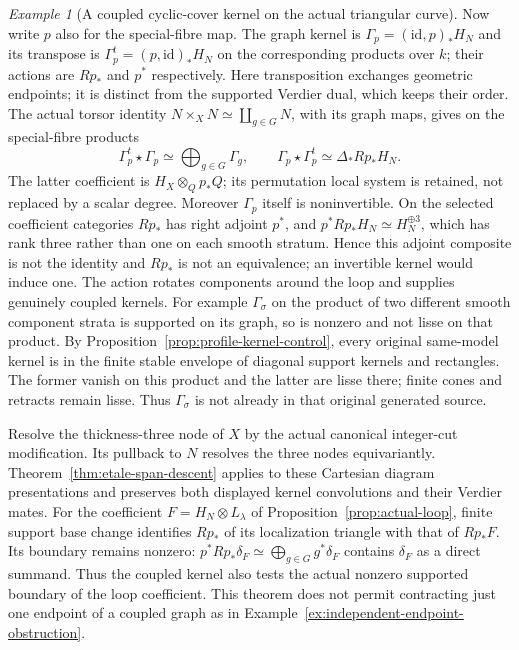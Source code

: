 \documentclass[11pt]{article}
\theoremstyle{definition}
\theoremstyle{remark}
\newtheorem{example}[theorem]{Example}
\begin{document}
\begin{example}[A coupled cyclic-cover kernel on the actual triangular curve]
Now write $p$ also for the special-fibre map. The graph kernel is
$\Gamma_p=(\mathrm{id},p)_*H_N$ and its transpose is
$\Gamma_p^t=(p,\mathrm{id})_*H_N$ on the corresponding products
over $k$; their actions are $Rp_*$ and $p^*$ respectively.
Here transposition exchanges geometric endpoints; it is distinct
from the supported Verdier dual, which keeps their order.
The actual torsor identity
$N\times_XN\simeq\coprod_{g\in G}N$, with its graph maps, gives
on the special-fibre products
\[
 \Gamma_p^t\star\Gamma_p\simeq
       \bigoplus_{g\in G}\Gamma_g,
 \qquad
 \Gamma_p\star\Gamma_p^t\simeq\Delta_*Rp_*H_N.
\]
The latter coefficient is $H_X\otimes_Q p_*Q$; its permutation
local system is retained, not replaced by a scalar degree.
Moreover $\Gamma_p$ itself is noninvertible. On the selected
coefficient categories $Rp_*$ has right adjoint $p^*$, and
$p^*Rp_*H_N\simeq H_N^{\oplus3}$, which has rank three rather than
one on each smooth stratum. Hence this adjoint composite is not
the identity and $Rp_*$ is not an equivalence; an invertible kernel
would induce one.
The action rotates components around the loop and supplies genuinely
coupled kernels. For example $\Gamma_\sigma$ on the product of two
different smooth component strata is supported on its graph, so is
nonzero and not lisse on that product. By
Proposition~\ref{prop:profile-kernel-control}, every original
same-model kernel is in the finite stable envelope of diagonal
support kernels and rectangles. The former vanish on this product
and the latter are lisse there; finite cones and retracts remain
lisse. Thus $\Gamma_\sigma$ is not already in that original generated
source.

Resolve the thickness-three node of $X$ by the actual canonical
integer-cut modification. Its pullback to $N$ resolves the three
nodes equivariantly. Theorem~\ref{thm:etale-span-descent} applies to
these Cartesian diagram presentations and preserves both displayed
kernel convolutions and their Verdier mates. For the coefficient
$F=H_N\otimes L_\lambda$ of Proposition~\ref{prop:actual-loop},
finite support base change identifies $Rp_*$ of its localization
triangle with that of $Rp_*F$. Its boundary remains nonzero:
$p^*Rp_*\delta_F\simeq\bigoplus_{g\in G}g^*\delta_F$ contains
$\delta_F$ as a direct summand. Thus the coupled kernel also tests
the actual nonzero supported boundary of the loop coefficient.
This theorem does not permit
contracting just one endpoint of a coupled graph as in
Example~\ref{ex:independent-endpoint-obstruction}.
\end{example}
\end{document}
